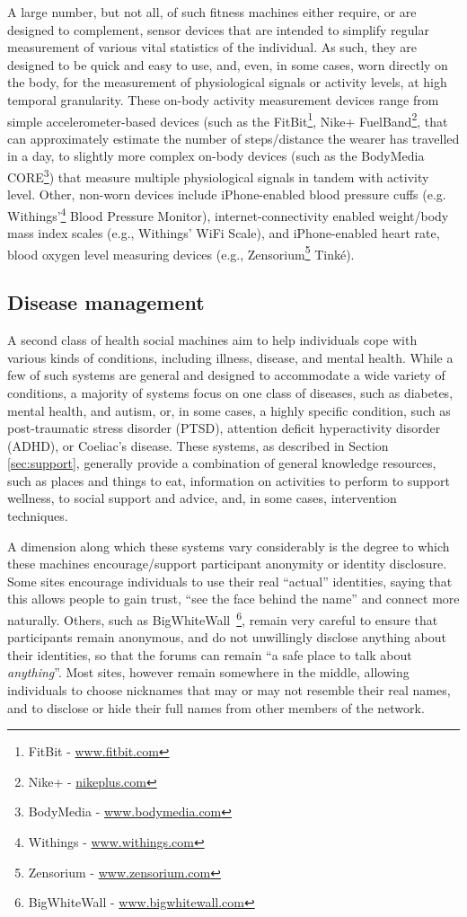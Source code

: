 \documentclass{sig-alternate}
\begin{document}
A large number, but not all, of such fitness machines either require,
or are designed to complement, sensor devices that are intended to
simplify regular measurement of various vital statistics of the
individual.  As such, they are designed to be quick and easy to use,
and, even, in some cases, worn directly on the body, for the
measurement of physiological signals or activity levels, at high
temporal granularity. These on-body activity measurement devices range
from simple accelerometer-based devices (such as the
FitBit\footnote{FitBit - \url{www.fitbit.com}}, Nike+ FuelBand\footnote{Nike+ -
  \url{nikeplus.com}}, that can approximately estimate the number of
steps/distance the wearer has travelled in a day, to slightly more
complex on-body devices (such as the BodyMedia CORE\footnote{BodyMedia
  - \url{www.bodymedia.com}}) that measure multiple physiological
signals in tandem with activity level.  Other, non-worn devices
include iPhone-enabled blood pressure cuffs
(e.g. Withings'\footnote{Withings - \url{www.withings.com}} Blood
Pressure Monitor), internet-connectivity enabled weight/body mass
index scales (e.g., Withings' WiFi Scale), and iPhone-enabled heart
rate, blood oxygen level measuring devices (e.g.,
Zensorium\footnote{Zensorium - \url{www.zensorium.com}} Tink\'{e}).

\subsection{Disease management}

A second class of health social machines aim to help individuals cope
with various kinds of conditions, including illness, disease, and
mental health.  While a few of such systems are general and designed
to accommodate a wide variety of conditions, a majority of systems
focus on one class of diseases, such as diabetes, mental health, and
autism, or, in some cases, a highly specific condition, such as
post-traumatic stress disorder (PTSD), attention deficit hyperactivity
disorder (ADHD), or Coeliac's disease.  These systems, as described in
Section \ref{sec:support}, generally provide a combination of
general knowledge resources, such as places and things to eat,
information on activities to perform to support wellness, to social
support and advice, and, in some cases, intervention techniques.

A dimension along which these systems vary considerably is the degree
to which these machines encourage/support participant anonymity or
identity disclosure.  Some sites encourage individuals to use their
real ``actual'' identities, saying that this allows people to gain
trust, ``see the face behind the name'' and connect more naturally.
Others, such as BigWhiteWall~\footnote{BigWhiteWall - \url{www.bigwhitewall.com}}, remain very careful to ensure that
participants remain anonymous, and do not unwillingly disclose
anything about their identities, so that the forums can remain ``a
safe place to talk about \emph{anything}''.  Most sites, however
remain somewhere in the middle, allowing individuals to choose
nicknames that may or may not resemble their real names, and to
disclose or hide their full names from other members of the network.
\end{document}
